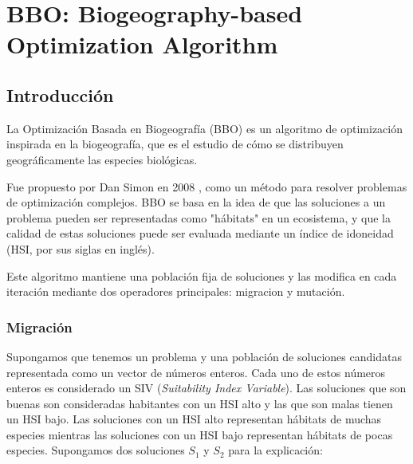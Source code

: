 \newtheorem{mydef}{Definición}
\section{BBO: Biogeography-based Optimization Algorithm}


\subsection{Introducción}
\label{sec:meta1_intro}

La Optimización Basada en Biogeografía (BBO) es un algoritmo de optimización inspirada en la biogeografía, que es el estudio de cómo se distribuyen geográficamente las especies biológicas.

Fue propuesto por Dan Simon en 2008 \cite{simon2008biogeography}, como un método para resolver problemas de optimización complejos. 
BBO se basa en la idea de que las soluciones a un problema pueden ser representadas como "hábitats" en un ecosistema, y que la calidad de estas soluciones puede ser evaluada mediante un índice de idoneidad (HSI, por sus siglas en inglés).

Este algoritmo mantiene una población fija de soluciones y las modifica en cada iteración mediante dos operadores principales: migracion y mutación.

\subsubsection{Migración} \label{sec:migration}

Supongamos que tenemos un problema y una población de soluciones candidatas representada como un vector de números enteros. Cada uno de estos números enteros es considerado un SIV (\textit{Suitability Index Variable}).
Las soluciones que son buenas son consideradas habitantes con un HSI alto y las que son malas tienen un HSI bajo. Las soluciones con un HSI alto representan hábitats de muchas especies mientras las soluciones con un HSI bajo representan hábitats de pocas especies. Supongamos dos soluciones $S_1$ y $S_2$ para la explicación:

